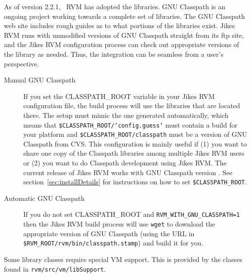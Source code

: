  As of version 2.2.1, \JikesTM\ RVM has adopted the
 libraries.  GNU
Classpath is an ongoing project working towards a complete set of
\JavaTM{} libraries.  The GNU Classpath web site includes
rough guides as to what portions of the libraries exist.  Jikes RVM
runs with unmodified versions of GNU Classpath straight from its ftp
site, and the Jikes RVM configuration process can check out
appropriate versions of the library as needed.  Thus, the integration
can be seamless from a user's perspective.

\begin{description}
\item[Manual GNU Classpath] If you set the CLASSPATH\_ROOT variable in
your Jikes RVM configuration file, the build process will use the
libraries that are located there.  The setup must mimic the one
generated automatically, which means that
{\tt \$CLASSPATH\_ROOT/`config.guess`} must contain a build for your platform
and {\tt \$CLASSPATH\_ROOT/classpath} must be a version of GNU Classpath from
CVS.  This configuration is mainly useful if (1) you want to share one
copy of the Classpath libraries among multiple Jikes RVM users or (2)
you want to do Classpath development using Jikes RVM. The
current release of Jikes RVM works with GNU Classpath version
\classpathversion. See section~\ref{sec:installDetails} for instructions
on how to set {\tt \$CLASSPATH\_ROOT}.

\item[Automatic GNU Classpath] If you do not set CLASSPATH\_ROOT and 
{\tt RVM\_WITH\_GNU\_CLASSPATH=1} then the Jikes RVM build process
will use {\tt wget} to download the appropriate version of GNU Classpath (using
the URL in {\tt \$RVM\_ROOT/rvm/bin/classpath.stamp}) and build it for
you. 
\end{description}

Some library classes require special VM support.  This is provided by
the classes found in {\tt rvm/src/vm/libSupport}. 

